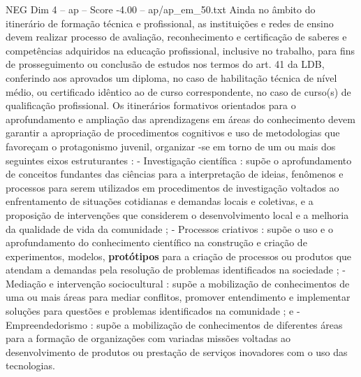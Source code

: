 \begin{textsample}{NEG Dim 4 – ap – Score -4.00 – ap/ap\_em\_50.txt}
Ainda no âmbito do itinerário de formação técnica e profissional, as instituições e redes de ensino devem realizar processo de avaliação, reconhecimento e certificação de saberes e competências adquiridos na educação profissional, inclusive no trabalho, para fins de prosseguimento ou conclusão de estudos nos termos do art. 41 da LDB, conferindo aos aprovados um diploma, no caso de habilitação técnica de nível médio, ou certificado idêntico ao de curso correspondente, no caso de curso(s) de qualificação profissional.
Os itinerários formativos orientados para o aprofundamento e ampliação das aprendizagens em áreas do conhecimento devem garantir a apropriação de procedimentos cognitivos e uso de metodologias que favoreçam o protagonismo juvenil, organizar -se em torno de um ou mais dos seguintes eixos estruturantes : - Investigação científica : supõe o aprofundamento de conceitos fundantes das ciências para a interpretação de ideias, fenômenos e processos para serem utilizados em procedimentos de investigação voltados ao enfrentamento de situações cotidianas e demandas locais e coletivas, e a proposição de intervenções que considerem o desenvolvimento local e a melhoria da qualidade de vida da comunidade ; - Processos criativos : supõe o uso e o aprofundamento do conhecimento científico na construção e criação de experimentos, modelos, \textbf{protótipos} para a criação de processos ou produtos que atendam a demandas pela resolução de problemas identificados na sociedade ; - Mediação e intervenção sociocultural : supõe a mobilização de conhecimentos de uma ou mais áreas para mediar conflitos, promover entendimento e implementar soluções para questões e problemas identificados na comunidade ; e - Empreendedorismo : supõe a mobilização de conhecimentos de diferentes áreas para a formação de organizações com variadas missões voltadas ao desenvolvimento de produtos ou prestação de serviços inovadores com o uso das tecnologias.

\end{textsample}
